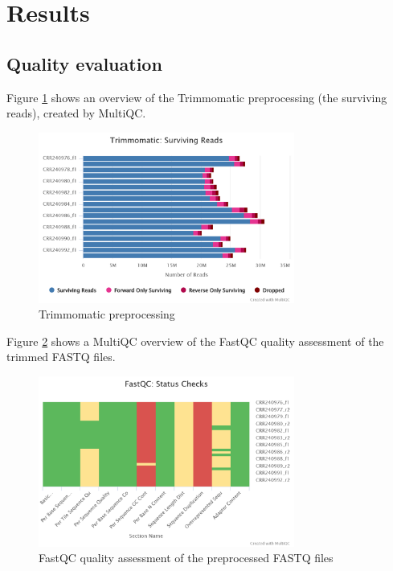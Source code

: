 \section{Results}

\subsection{Quality evaluation}

Figure \ref{fig:0.1-MultiQC_FastQC_status_checks} shows an overview of the Trimmomatic preprocessing (the surviving reads), created by MultiQC.

\begin{figure}[htbp]
    \caption{Trimmomatic preprocessing}
    \label{fig:0.1-MultiQC_FastQC_status_checks}
    \includegraphics[width=0.75\textwidth]{../../results/multiqc/Plot-Exports/trimmomatic-surviving_reads}
\end{figure}

Figure \ref{fig:0.2-MultiQC_FastQC_status_checks} shows a MultiQC overview of the FastQC quality assessment of the trimmed FASTQ files.

\begin{figure}[htbp]
    \caption{FastQC quality assessment of the preprocessed FASTQ files}
    \label{fig:0.2-MultiQC_FastQC_status_checks}
    \includegraphics[width=0.75\textwidth]{../../results/multiqc/Plot-Exports/fastqc-status-check-heatmap}
\end{figure}

